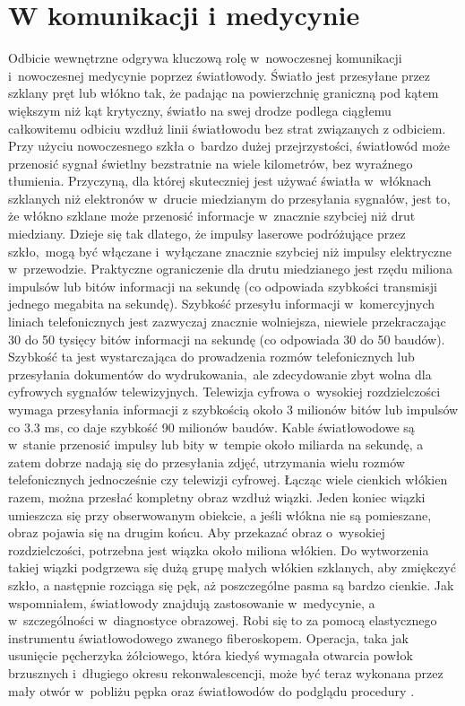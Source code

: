 \section{W komunikacji i medycynie}
 \indent Odbicie wewnętrzne odgrywa kluczową rolę w~nowoczesnej komunikacji i~nowoczesnej medycynie poprzez światłowody. Światło jest przesyłane przez szklany pręt lub włókno tak, że padając na powierzchnię graniczną pod kątem większym niż kąt krytyczny, światło na swej drodze podlega ciągłemu całkowitemu odbiciu wzdłuż linii światłowodu bez strat związanych z odbiciem. Przy użyciu nowoczesnego szkła o~bardzo dużej przejrzystości, światłowód może przenosić sygnał świetlny bezstratnie na wiele kilometrów, bez wyraźnego tłumienia. Przyczyną, dla której skuteczniej jest używać światła w~włóknach szklanych niż elektronów w~drucie miedzianym do przesyłania sygnałów, jest to, że włókno szklane może przenosić informacje w~znacznie szybciej niż drut miedziany. Dzieje się tak dlatego, że impulsy laserowe podróżujące przez szkło,~mogą być włączane i~wyłączane znacznie szybciej niż impulsy elektryczne w~przewodzie. Praktyczne ograniczenie dla drutu miedzianego jest rzędu miliona impulsów lub bitów informacji na sekundę (co odpowiada szybkości transmisji jednego megabita na sekundę). Szybkość przesyłu informacji w~komercyjnych liniach telefonicznych jest zazwyczaj znacznie wolniejsza, niewiele przekraczając 30 do 50 tysięcy bitów informacji na sekundę (co odpowiada 30 do 50 baudów). Szybkość ta jest wystarczająca do prowadzenia rozmów telefonicznych lub przesyłania dokumentów do wydrukowania,~ale zdecydowanie zbyt wolna dla cyfrowych sygnałów telewizyjnych. Telewizja cyfrowa o~wysokiej rozdzielczości wymaga przesyłania informacji z szybkością około 3 milionów bitów lub impulsów co $3.3$ ms, co daje szybkość 90 milionów baudów. Kable światłowodowe są w~stanie przenosić impulsy lub bity w~tempie około miliarda na sekundę, a zatem dobrze nadają się do przesyłania zdjęć, utrzymania wielu rozmów telefonicznych jednocześnie czy telewizji cyfrowej. Łącząc wiele cienkich włókien razem, można przesłać kompletny obraz wzdłuż wiązki. Jeden koniec wiązki umieszcza się przy obserwowanym obiekcie, a jeśli włókna nie są pomieszane, obraz pojawia się na drugim końcu. Aby przekazać obraz o~wysokiej rozdzielczości, potrzebna jest wiązka około miliona włókien. Do wytworzenia takiej wiązki podgrzewa się dużą grupę małych włókien szklanych, aby zmiękczyć szkło, a następnie rozciąga się pęk, aż poszczególne pasma są bardzo cienkie. Jak wspomniałem, światłowody znajdują zastosowanie w~medycynie, a w~szczególności w~diagnostyce obrazowej. Robi się to za pomocą elastycznego instrumentu światłowodowego zwanego fiberoskopem. Operacja, taka jak usunięcie pęcherzyka żółciowego, która kiedyś wymagała otwarcia powłok brzusznych i~długiego okresu rekonwalescencji, może być teraz wykonana przez mały otwór w~pobliżu pępka oraz światłowodów do podglądu procedury \cite{huggins1999physics2000}.

